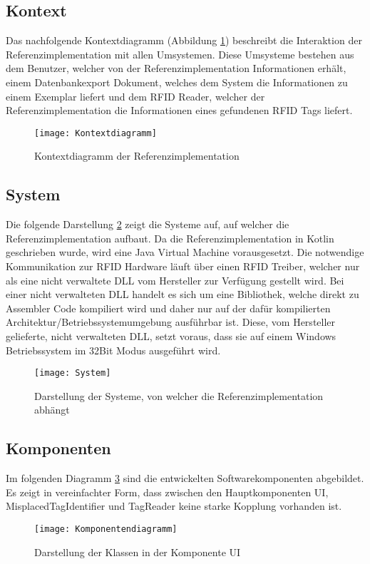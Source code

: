 \subsection{Kontext}

Das nachfolgende Kontextdiagramm (Abbildung \ref{fig:Kontextdiagramm}) beschreibt die Interaktion der Referenzimplementation mit allen Umsystemen. Diese Umsysteme bestehen aus dem Benutzer, welcher von der Referenzimplementation Informationen erhält, einem Datenbankexport Dokument, welches dem System die Informationen zu einem Exemplar liefert und dem RFID Reader, welcher der Referenzimplementation die Informationen eines gefundenen RFID Tags liefert.
\begin{figure}[htb]
	\centering
	\texttt{[image: Kontextdiagramm]}
	\caption{Kontextdiagramm der Referenzimplementation}
	\label{fig:Kontextdiagramm}
\end{figure}

\subsection{System}
Die folgende Darstellung \ref{fig:System} zeigt die Systeme auf, auf welcher die Referenzimplementation aufbaut.
Da die Referenzimplementation in Kotlin geschrieben wurde, wird eine Java Virtual Machine vorausgesetzt. Die notwendige Kommunikation zur RFID Hardware läuft über einen RFID Treiber, welcher nur als eine nicht verwaltete \gls{DLL} vom Hersteller zur Verfügung gestellt wird. Bei einer nicht verwalteten \gls{DLL} handelt es sich um eine Bibliothek, welche direkt zu Assembler Code kompiliert wird und daher nur auf der dafür kompilierten Architektur/Betriebssystemumgebung ausführbar ist. Diese, vom Hersteller gelieferte, nicht verwalteten \gls{DLL}, setzt voraus, dass sie auf einem Windows Betriebssystem im 32Bit Modus ausgeführt wird.
\begin{figure}[htb]
	\centering
	\texttt{[image: System]}
	\caption{Darstellung der Systeme, von welcher die Referenzimplementation abhängt}
	\label{fig:System}
\end{figure}

\subsection{Komponenten}
Im folgenden Diagramm \ref{fig:Components} sind die entwickelten Softwarekomponenten abgebildet. Es zeigt in vereinfachter Form, dass zwischen den Hauptkomponenten UI, MisplacedTagIdentifier und TagReader keine starke Kopplung vorhanden ist.
\begin{figure}[htb]
	\centering
	\texttt{[image: Komponentendiagramm]}
	\caption{Darstellung der Klassen in der Komponente UI}
	\label{fig:Components}
\end{figure}


